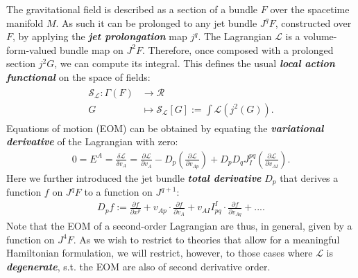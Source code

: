 \documentclass[%
preprint,
nofootinbib,
amsmath,amssymb,
aps,
prd,
floatfix,
]{revtex4-2}
\begin{document}
The gravitational field is described as a section of a bundle $F$ over the spacetime manifold $M$. As such it can be prolonged to any jet bundle $J^qF$, constructed over $F$, by applying the \textit{\textbf{jet prolongation}} map $j^q$. 
The Lagrangian $\mathcal{L}$ is a volume-form-valued bundle map on $J^2F$. Therefore, once composed with a prolonged section $j^2G$, we can compute its integral.
This defines the usual \textit{\textbf{local action functional}} on the space of fields:
\begin{align}
\begin{aligned}
    \mathcal{S}_{\mathcal{L}} : \Gamma(F) &\longrightarrow \mathcal{R} \\
    G &\longmapsto \mathcal{S}_{\mathcal{L}}[G] := \int \mathcal{L}(j^2(G)).
\end{aligned}
\end{align}
Equations of motion (EOM) can be obtained by equating the \textit{\textbf{variational derivative}} of the Lagrangian with zero:
\begin{align}
  0 = E^A = \frac{\delta \mathcal{L}}{\delta v_A} = 
  \frac{\partial\mathcal{L}}{\partial v_A} - D_p ( \frac{\partial \mathcal{L}}{\partial v_{Ap}}) 
  + D_p D_q J^{pq}_I (\frac{\partial \mathcal{L}}{\partial v_{AI}}).
\end{align}
Here we further introduced the jet bundle \textit{\textbf{total derivative}} $D_p$ that
derives a function $f$ on $J^qF$ to a function on $J^{q+1}$:
\begin{align}
    D_p f := \frac{\partial f}{\partial x^p} + v_{Ap} \cdot  \frac{\partial f}{\partial v_A} + v_{AI} I^{I}_{pq} \cdot \frac{\partial f}{ \partial v_{Aq}}+... .
\end{align}
Note that the EOM of a second-order Lagrangian are thus, in general, given by a function on $J^4F$. As we wish to restrict to theories that allow for a meaningful Hamiltonian formulation, we will restrict, however, to those cases where $\mathcal{L}$ is \textit{\textbf{degenerate}}, s.t. the EOM are also of second derivative order. 
\end{document}
